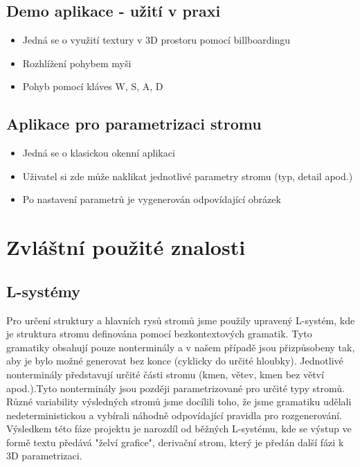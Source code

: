 \documentclass[11pt,a4paper]{article}
\begin{document}
\subsection{Demo aplikace - užití v praxi}
\begin{itemize}
\item Jedná se o využití textury v 3D prostoru pomocí billboardingu
\item Rozhlížení pohybem myši
\item Pohyb pomocí kláves W, S, A, D
\end{itemize}

\subsection{Aplikace pro parametrizaci stromu}
\begin{itemize}
\item Jedná se o klasickou okenní aplikaci
\item Uživatel si zde může naklikat jednotlivé parametry stromu (typ, detail apod.)
\item Po nastavení parametrů je vygenerován odpovídající obrázek
\end{itemize}
\section{Zvláštní použité znalosti}

%

\subsection{L-systémy}
Pro určení struktury a hlavních rysů stromů jsme použily upravený L-systém,
kde je struktura stromu definována pomocí bezkontextových gramatik. Tyto gramatiky
obsahují pouze nonterminály a v našem případě jsou přizpůsobeny tak, aby je bylo možné
generovat bez konce (cyklicky do určité hloubky). Jednotlivé nonterminály představují
určité části stromu (kmen, větev, kmen bez větví apod.).Tyto nonterminály jsou později
parametrizované pro určité typy stromů. Různé variability výsledných stromů jsme
docílili toho, že jsme gramatiku udělali nedeterministickou a vybírali náhodně
odpovídající pravidla pro rozgenerování. Výsledkem této fáze projektu je narozdíl
od běžných L-systému, kde se výstup ve formě textu předává "želví grafice",
derivační strom, který je předán další fázi k 3D parametrizaci.
\end{document}
